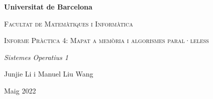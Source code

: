 
\begin{titlepage}
\centering
    \vspace{1cm}
    {\bfseries\LARGE Universitat de Barcelona \par}
    \vspace{1cm}
    {\scshape\Large Facultat de Matemàtiques i Informàtica \par}
    \vspace{4cm}
    {\scshape\Huge Informe Pràctica 4: Mapat a memòria i algorismes paral·leless \par}
    \vspace{2cm}
    {\itshape\LARGE Sistemes Operatius 1 \par}
    \vfill
    {\Large Junjie Li i Manuel Liu Wang\par}
    \vfill
    {\Large Maig 2022 \par}
\end{titlepage}



